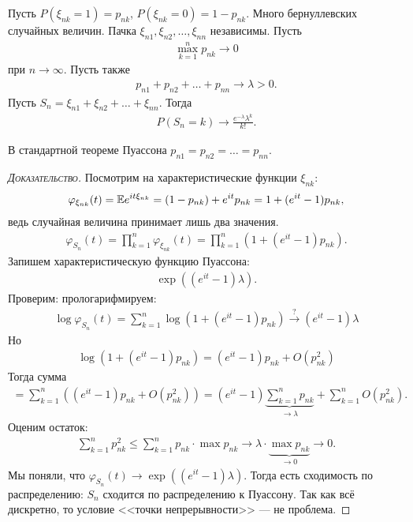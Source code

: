 \documentclass[../main.tex]{subfiles}
\begin{document}
\begin{thm}[Пуассона]
 Пусть $ P(\xi_{nk} = 1) = p_{nk} $, $ P(\xi_{nk} = 0) = 1-p_{nk} $. Много бернуллевских случайных величин. Пачка $ \xi_{n 1}, \xi_{n 2}, \ldots, \xi_{n n} $ независимы. Пусть
 \begin{align*}
  \max_{k=1}^{n} p_{nk} \to 0
 \end{align*} при $ n \to \infty $. Пусть также
 \begin{align*}
  p_{n 1}  + p_{n 2} + \ldots + p_{n n} \to \lambda > 0.
 \end{align*} Пусть $ S_n = \xi_{n 1} + \xi_{n 2} + \ldots + \xi_{n n} $. Тогда
 \begin{align*}
  P(S_n = k) \to \frac{e^{-\lambda}\lambda^{k}}{k!}.
 \end{align*}
\end{thm}
В стандартной теореме Пуассона $ p_{n 1} = p_{n 2 } = \ldots = p_{n n} $.
\begin{proof}[\normalfont\textsc{Доказательство}]
 Посмотрим на характеристические функции $ \xi_{n k} $:
 \begin{align*}
  \varphi_{\xi_{n k}}(t) = \mathbb E e^{it \xi_{n k}} = (1 - p_{n k}) + e^{it} p_{n k} = 1 + (e^{it} - 1)p_{n k},
 \end{align*} ведь случайная величина принимает лишь два значения.
 \begin{align*}
  \varphi_{S_n}(t) = \prod_{k=1}^{n} \varphi_{\xi_{n k}}(t) = \prod_{k=1}^{n} (1 + (e^{it} - 1)p_{n k}).
 \end{align*} Запишем характеристическую функцию Пуассона:
 \begin{align*}
  \exp((e^{it} - 1)\lambda).
 \end{align*} Проверим: прологарифмируем:
 \begin{align*}
  \log \varphi_{S_n}(t) = \sum_{k=1}^{n}\log (1 + (e^{it} - 1)p_{nk}) \overset{?}{\to} (e^{it} - 1) \lambda
 \end{align*} Но
 \begin{align*}
  \log(1 + (e^{it} - 1)p_{n k}) = (e^{it} - 1)p_{n k} + O(p_{n k}^{2})
 \end{align*} Тогда сумма
 \begin{align*}
  = \sum_{k=1}^{n} \left( (e^{it}-1)p_{nk} +O(p_{nk}^{2}) \right) = (e^{it} - 1) \underbrace{\sum_{k=1}^{n}p_{nk}}_{\to \lambda} + \sum_{k = 1}^{n} O(p_{nk} ^{ 2}).
 \end{align*} Оценим остаток:
 \begin{align*}
  \sum_{k=1}^{n}p_{nk}^{2} \leqslant \sum_{k=1}^{n} p_{nk} \cdot \max p_{n k} \to \lambda \cdot \underbrace{\max p_{nk}}_{\to 0} \to 0.
 \end{align*} Мы поняли, что $ \varphi_{S_n}(t) \to \exp((e^{it}-1)\lambda) $. Тогда есть сходимость по распределению: $ S_n $ сходится по распределению к Пуассону. Так как всё дискретно, то условие <<точки непрерывности>> --- не проблема.
\end{proof}
\end{document}
